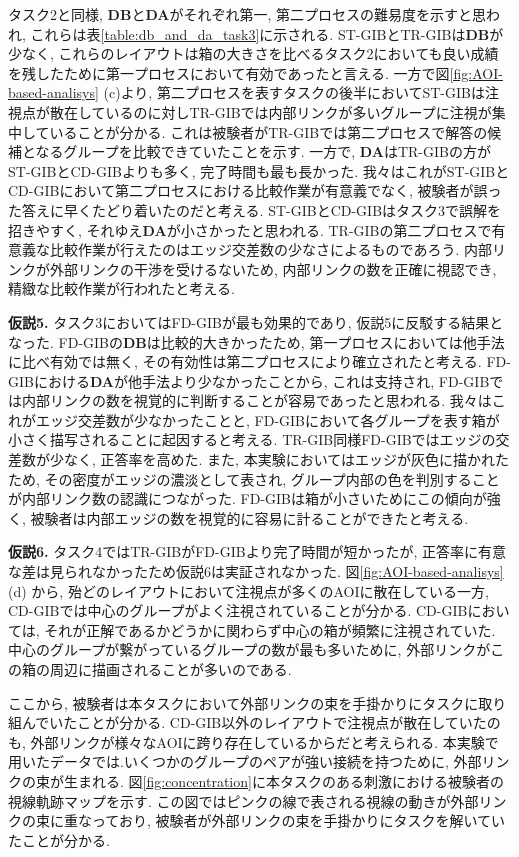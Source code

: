 \documentclass{kuee}
\begin{document}
タスク2と同様, {\bf DB}と{\bf DA}がそれぞれ第一, 第二プロセスの難易度を示すと思われ, これらは表\ref{table:db_and_da_task3}に示される.
ST-GIBとTR-GIBは{\bf DB}が少なく, これらのレイアウトは箱の大きさを比べるタスク2においても良い成績を残したために第一プロセスにおいて有効であったと言える.
一方で図\ref{fig:AOI-based-analisys} (c)より, 第二プロセスを表すタスクの後半においてST-GIBは注視点が散在しているのに対しTR-GIBでは内部リンクが多いグループに注視が集中していることが分かる.
これは被験者がTR-GIBでは第二プロセスで解答の候補となるグループを比較できていたことを示す.
一方で, {\bf DA}はTR-GIBの方がST-GIBとCD-GIBよりも多く, 完了時間も最も長かった.
我々はこれがST-GIBとCD-GIBにおいて第二プロセスにおける比較作業が有意義でなく, 被験者が誤った答えに早くたどり着いたのだと考える.
ST-GIBとCD-GIBはタスク3で誤解を招きやすく, それゆえ{\bf DA}が小さかったと思われる.
TR-GIBの第二プロセスで有意義な比較作業が行えたのはエッジ交差数の少なさによるものであろう.
内部リンクが外部リンクの干渉を受けるないため, 内部リンクの数を正確に視認でき, 精緻な比較作業が行われたと考える.

{\bf 仮説5.} タスク3においてはFD-GIBが最も効果的であり, 仮説5に反駁する結果となった.
FD-GIBの{\bf DB}は比較的大きかったため, 第一プロセスにおいては他手法に比べ有効では無く, その有効性は第二プロセスにより確立されたと考える.
FD-GIBにおける{\bf DA}が他手法より少なかったことから, これは支持され, FD-GIBでは内部リンクの数を視覚的に判断することが容易であったと思われる.
我々はこれがエッジ交差数が少なかったことと, FD-GIBにおいて各グループを表す箱が小さく描写されることに起因すると考える.
TR-GIB同様FD-GIBではエッジの交差数が少なく, 正答率を高めた.
また, 本実験においてはエッジが灰色に描かれたため, その密度がエッジの濃淡として表され, グループ内部の色を判別することが内部リンク数の認識につながった.
FD-GIBは箱が小さいためにこの傾向が強く, 被験者は内部エッジの数を視覚的に容易に計ることができたと考える.

{\bf 仮説6.} タスク4ではTR-GIBがFD-GIBより完了時間が短かったが, 正答率に有意な差は見られなかったため仮説6は実証されなかった.
図\ref{fig:AOI-based-analisys} (d) から, 殆どのレイアウトにおいて注視点が多くのAOIに散在している一方, CD-GIBでは中心のグループがよく注視されていることが分かる.
CD-GIBにおいては, それが正解であるかどうかに関わらず中心の箱が頻繁に注視されていた.
中心のグループが繋がっているグループの数が最も多いために, 外部リンクがこの箱の周辺に描画されることが多いのである.

ここから, 被験者は本タスクにおいて外部リンクの束を手掛かりにタスクに取り組んでいたことが分かる.
CD-GIB以外のレイアウトで注視点が散在していたのも, 外部リンクが様々なAOIに跨り存在しているからだと考えられる.
本実験で用いたデータでは.いくつかのグループのペアが強い接続を持つために, 外部リンクの束が生まれる.
図\ref{fig:concentration}に本タスクのある刺激における被験者の視線軌跡マップを示す.
この図ではピンクの線で表される視線の動きが外部リンクの束に重なっており, 被験者が外部リンクの束を手掛かりにタスクを解いていたことが分かる.
\end{document}
